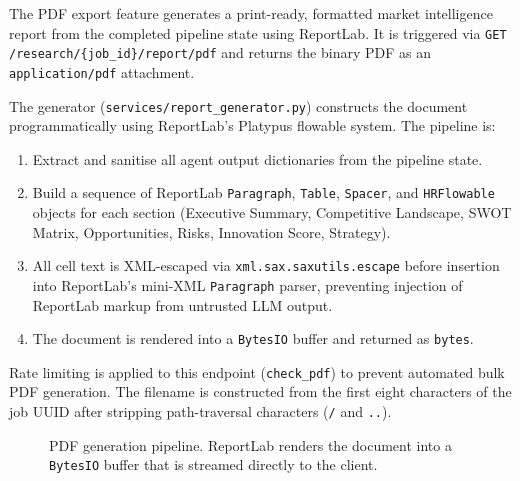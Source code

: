 \documentclass[12pt,a4paper,oneside]{book}
\begin{document}
The PDF export feature generates a print-ready, formatted market intelligence
report from the completed pipeline state using ReportLab. It is triggered via
\texttt{GET /research/\{job\_id\}/report/pdf} and returns the binary PDF as an
\texttt{application/pdf} attachment.

The generator (\texttt{services/report\_generator.py}) constructs the document
programmatically using ReportLab's Platypus flowable system. The pipeline is:

\begin{enumerate}
  \item Extract and sanitise all agent output dictionaries from the pipeline state.
  \item Build a sequence of ReportLab \texttt{Paragraph}, \texttt{Table}, \texttt{Spacer},
        and \texttt{HRFlowable} objects for each section (Executive Summary, Competitive
        Landscape, SWOT Matrix, Opportunities, Risks, Innovation Score, Strategy).
  \item All cell text is XML-escaped via \texttt{xml.sax.saxutils.escape} before
        insertion into ReportLab's mini-XML \texttt{Paragraph} parser, preventing
        injection of ReportLab markup from untrusted LLM output.
  \item The document is rendered into a \texttt{BytesIO} buffer and returned as
        \texttt{bytes}.
\end{enumerate}

Rate limiting is applied to this endpoint (\texttt{check\_pdf}) to prevent
automated bulk PDF generation. The filename is constructed from the first eight
characters of the job UUID after stripping path-traversal characters
(\texttt{/} and \texttt{..}).

\begin{figure}[H]
\centering
{}
\caption{PDF generation pipeline. ReportLab renders the document into a
\texttt{BytesIO} buffer that is streamed directly to the client.}
\label{fig:pdf_pipeline}
\end{figure}
\end{document}
